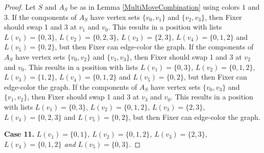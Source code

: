 \documentclass[12pt]{amsart}
\theoremstyle{plain}
\theoremstyle{definition}
\theoremstyle{remark}
\begin{document}
\begin{proof}
Let $S$ and $A_S$ be as in Lemma \ref{MultiMoveCombination} using colors $1$ and $3$. If the components of $A_S$ have vertex sets $\{v_0, v_1\}$ and $\{v_2, v_3\}$, then Fixer should swap 1 and 3 at $v_1$ and $v_0$. This results in a position with lists $L(v_1) = \{0, 3\}$, $L(v_2) = \{0, 2, 3\}$, $L(v_3) = \{2, 3\}$, $L(v_4) = \{0, 1, 2\}$ and $L(v_5) = \{0, 2\}$, but then Fixer can edge-color the graph.
If the components of $A_S$ have vertex sets $\{v_0, v_2\}$ and $\{v_1, v_3\}$, then Fixer should swap 1 and 3 at $v_2$ and $v_0$. This results in a position with lists $L(v_1) = \{0, 3\}$, $L(v_2) = \{0, 1, 2\}$, $L(v_3) = \{1, 2\}$, $L(v_4) = \{0, 1, 2\}$ and $L(v_5) = \{0, 2\}$, but then Fixer can edge-color the graph.
If the components of $A_S$ have vertex sets $\{v_0, v_3\}$ and $\{v_1, v_2\}$, then Fixer should swap 1 and 3 at $v_3$ and $v_0$. This results in a position with lists $L(v_1) = \{0, 3\}$, $L(v_2) = \{0, 1, 2\}$, $L(v_3) = \{2, 3\}$, $L(v_4) = \{0, 2, 3\}$ and $L(v_5) = \{0, 2\}$, but then Fixer can edge-color the graph.

\noindent\textbf{Case 11.  }\textit{$L(v_1) = \{0, 1\}$, $L(v_2) = \{0, 1, 2\}$, $L(v_3) = \{2, 3\}$, $L(v_4) = \{0, 1, 2\}$ and $L(v_5) = \{0, 3\}$.}


\end{proof}
\end{document}
